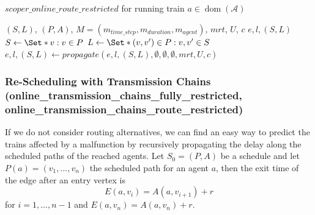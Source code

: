 \documentclass{article}
\DeclareMathOperator{\dom}{dom}
\begin{document}
\begin{algorithm}
	\caption{$scoper\_online\_route\_restricted$ for running train $a \in \dom(\mathcal{A})$} \label{algo:scoper_online_route_restricted}
	\begin{algorithmic}[1]
		\Require $(S,L)$, $(P,A)$, $M=(m_{time\_step},m_{duration},m_{agent})$, $mrt$, $U$, $c$
	    \Ensure $e,l,(S,L)$
        \State $S \leftarrow \Set*{v: v\in P}$
        \State $L \leftarrow \Set*{(v,v^\prime) \in P: v,v^\prime \in S}$
        \State $e,l,(S,L) \leftarrow propagate(e,l,(S,L),\emptyset, \emptyset, \emptyset, mrt, U, c)$
	\end{algorithmic}
\end{algorithm}


\subsubsection{Re-Scheduling with Transmission Chains\\ (online\_transmission\_chains\_fully\_restricted,\\online\_transmission\_chains\_route\_restricted)}
\label{subsubsec:scope_online_tranmission_chains}


If we do not consider routing alternatives, we can find an easy way to predict the trains affected by a malfunction by recursively propagating the delay along the scheduled paths of the reached agents.
%
Let $S_0=(P,A)$ be a schedule and let $P(a) = (v_1,\ldots,v_n)$ the scheduled path for an agent $a$, then  the exit time of the edge after an entry vertex is
\begin{equation}
E(a,v_i) = A(a,v_{i+1}) + r
\end{equation}
for $i=1,\ldots,n-1$ and $E(a,v_n) = A(a,v_n)+r$.
\end{document}
